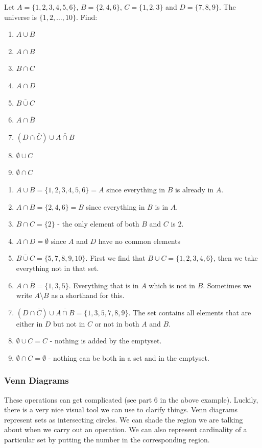 \begin{example}
 Let $A = \{1, 2, 3, 4, 5, 6\}$, $B = \{2, 4, 6\}$, $C = \{1, 2, 3\}$ and $D = \{7, 8, 9\}$.  The universe is $\{1, 2, \ldots, 10\}$.  Find:
\begin{multicols}{3}
 \begin{enumerate}
  \item $A \cup B$
\item $A \cap B$
\item $B \cap C$
\item $A \cap D$
\item $\bar{B \cup C}$
\item $A \cap \bar B$
\item $(D \cap \bar C) \cup \bar{A \cap B}$
\item $\emptyset \cup C$
\item $\emptyset \cap C$
 \end{enumerate}
\end{multicols}
\begin{solution}
  \begin{enumerate}
  \item $A \cup B = \{1, 2, 3, 4, 5, 6\} = A$ since everything in $B$ is already in $A$.
\item $A \cap B = \{2, 4, 6\} = B$ since everything in $B$ is in $A$.
\item $B \cap C = \{2\}$ - the only element of both $B$ and $C$ is 2.
\item $A \cap D = \emptyset$ since $A$ and $D$ have no common elements
\item $\bar{B \cup C} = \{5, 7, 8, 9, 10\}$.  First we find that $B \cup C = \{1, 2, 3, 4, 6\}$, then we take everything not in that set.
\item $A \cap \bar B = \{1, 3, 5\}$.  Everything that is in $A$ which is not in $B$.  Sometimes we write $A \setminus B$ as a shorthand for this.
\item $(D \cap \bar C) \cup \bar{A \cap B} = \{1, 3, 5, 7, 8, 9\}.$ The set contains all elements that are either in $D$ but not in $C$ or not in both $A$ and $B$.
\item $\emptyset \cup C = C$ - nothing is added by the emptyset.
\item $\emptyset \cap C = \emptyset$ - nothing can be both in a set and in the emptyset.
 \end{enumerate}
\end{solution}
\end{example}

\subsubsection*{Venn Diagrams}
These operations can get complicated (see part 6 in the above example).  Luckily, there is a very nice visual tool we can use to clarify things.  Venn diagrams represent sets as intersecting circles.  We can shade the region we are talking about when we carry out an operation.  We can also represent cardinality of a particular set by putting the number in the corresponding region.\\

